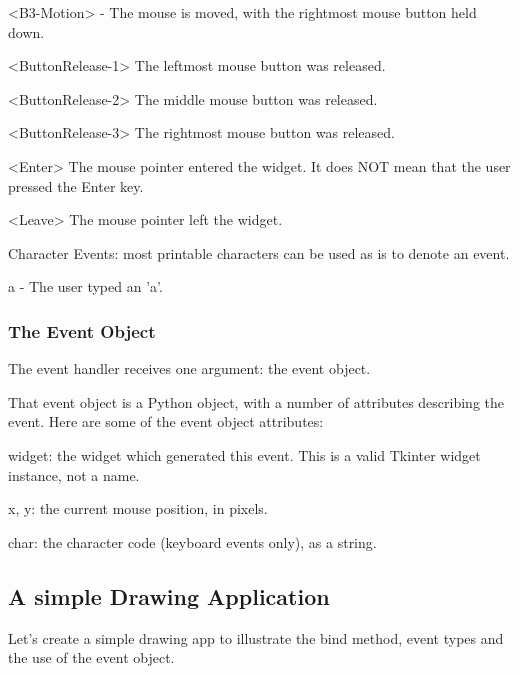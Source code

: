 \documentclass{article}
\begin{document}
<B3-Motion> - The mouse is moved, with the rightmost mouse button held down.

<ButtonRelease-1> The leftmost mouse button was released. 

<ButtonRelease-2> The middle mouse button was released. 

<ButtonRelease-3> The rightmost mouse button was released. 

<Enter> The mouse pointer entered the widget. It does NOT mean that the user pressed the Enter key.

<Leave> The mouse pointer left the widget.

Character Events:  most printable characters can be used as is to denote an event. 

a - The user typed an 'a'. 

\subsubsection{The Event Object}

The event handler receives one argument: the event object.

That event object is a Python object, with a number of attributes describing the event. Here are some of the event object attributes:

widget: the widget which generated this event.   This is a valid Tkinter widget instance, not a name.

x, y: the current mouse position, in pixels.

char: the character code (keyboard events only), as a string.

\subsection{A simple Drawing Application}
Let's create a simple drawing app to illustrate the bind method, event types and the use of the event object.
\end{document}
